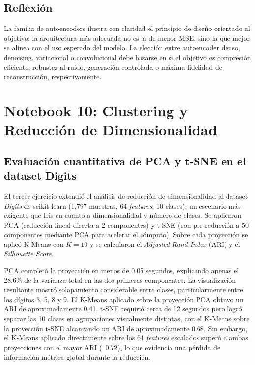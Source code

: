 \documentclass[12pt, a4paper]{article}
\begin{document}
\subsection{Reflexión}

La familia de autoencoders ilustra con claridad el principio de diseño orientado al objetivo: la arquitectura más adecuada no es la de menor MSE, sino la que mejor se alinea con el uso esperado del modelo. La elección entre autoencoder denso, denoising, variacional o convolucional debe basarse en si el objetivo es compresión eficiente, robustez al ruido, generación controlada o máxima fidelidad de reconstrucción, respectivamente.

\section{Notebook 10: Clustering y Reducción de Dimensionalidad}

\subsection{Evaluación cuantitativa de PCA y t-SNE en el dataset Digits}

El tercer ejercicio extendió el análisis de reducción de dimensionalidad al dataset \textit{Digits} de scikit-learn (1,797 muestras, 64 \textit{features}, 10 clases), un escenario más exigente que Iris en cuanto a dimensionalidad y número de clases. Se aplicaron PCA (reducción lineal directa a 2 componentes) y t-SNE (con pre-reducción a 50 componentes mediante PCA para acelerar el cómputo). Sobre cada proyección se aplicó K-Means con $K=10$ y se calcularon el \textit{Adjusted Rand Index} (ARI) y el \textit{Silhouette Score}.

PCA completó la proyección en menos de 0.05 segundos, explicando apenas el 28.6\% de la varianza total en las dos primeras componentes. La visualización resultante mostró solapamiento considerable entre clases, particularmente entre los dígitos 3, 5, 8 y 9. El K-Means aplicado sobre la proyección PCA obtuvo un ARI de aproximadamente 0.41. t-SNE requirió cerca de 12 segundos pero logró separar las 10 clases en agrupaciones visualmente distintas, con el K-Means sobre la proyección t-SNE alcanzando un ARI de aproximadamente 0.68. Sin embargo, el K-Means aplicado directamente sobre los 64 \textit{features} escalados superó a ambas proyecciones con el mayor ARI (~0.72), lo que evidencia una pérdida de información métrica global durante la reducción.
\end{document}
